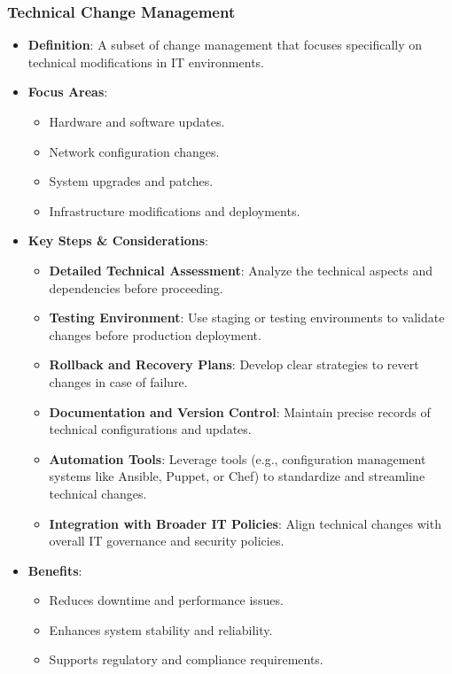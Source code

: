 \documentclass[11pt]{article}
\begin{document}
\subsubsection{Technical Change Management}
\label{sec:org437ac84}
\begin{itemize}
\item \textbf{Definition}: A subset of change management that focuses specifically on technical modifications in IT environments.
\item \textbf{Focus Areas}:
\begin{itemize}
\item Hardware and software updates.
\item Network configuration changes.
\item System upgrades and patches.
\item Infrastructure modifications and deployments.
\end{itemize}
\item \textbf{Key Steps \& Considerations}:
\begin{itemize}
\item \textbf{\textbf{Detailed Technical Assessment}}: Analyze the technical aspects and dependencies before proceeding.
\item \textbf{\textbf{Testing Environment}}: Use staging or testing environments to validate changes before production deployment.
\item \textbf{\textbf{Rollback and Recovery Plans}}: Develop clear strategies to revert changes in case of failure.
\item \textbf{\textbf{Documentation and Version Control}}: Maintain precise records of technical configurations and updates.
\item \textbf{\textbf{Automation Tools}}: Leverage tools (e.g., configuration management systems like Ansible, Puppet, or Chef) to standardize and streamline technical changes.
\item \textbf{\textbf{Integration with Broader IT Policies}}: Align technical changes with overall IT governance and security policies.
\end{itemize}
\item \textbf{Benefits}:
\begin{itemize}
\item Reduces downtime and performance issues.
\item Enhances system stability and reliability.
\item Supports regulatory and compliance requirements.
\end{itemize}
\end{itemize}
\end{document}
